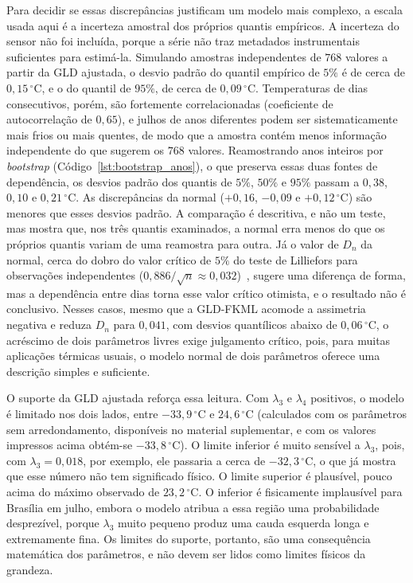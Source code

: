 Para decidir se essas discrepâncias justificam um modelo mais complexo, a escala usada aqui é a incerteza amostral dos próprios quantis empíricos. A incerteza do sensor não foi incluída, porque a série não traz metadados instrumentais suficientes para estimá-la. Simulando amostras independentes de $768$ valores a partir da GLD ajustada, o desvio padrão do quantil empírico de $5\%$ é de cerca de $0{,}15\,^\circ\text{C}$, e o do quantil de $95\%$, de cerca de $0{,}09\,^\circ\text{C}$. Temperaturas de dias consecutivos, porém, são fortemente correlacionadas (coeficiente de autocorrelação de $0{,}65$), e julhos de anos diferentes podem ser sistematicamente mais frios ou mais quentes, de modo que a amostra contém menos informação independente do que sugerem os $768$ valores. Reamostrando anos inteiros por \textit{bootstrap} (Código~\ref{lst:bootstrap_anos}), o que preserva essas duas fontes de dependência, os desvios padrão dos quantis de $5\%$, $50\%$ e $95\%$ passam a $0{,}38$, $0{,}10$ e $0{,}21\,^\circ\text{C}$. As discrepâncias da normal ($+0{,}16$, $-0{,}09$ e $+0{,}12\,^\circ\text{C}$) são menores que esses desvios padrão. A comparação é descritiva, e não um teste, mas mostra que, nos três quantis examinados, a normal erra menos do que os próprios quantis variam de uma reamostra para outra. Já o valor de $D_n$ da normal, cerca do dobro do valor crítico de $5\%$ do teste de Lilliefors para observações independentes ($0{,}886/\sqrt{n} \approx 0{,}032$)~\cite{lilliefors1967}, sugere uma diferença de forma, mas a dependência entre dias torna esse valor crítico otimista, e o resultado não é conclusivo. Nesses casos, mesmo que a GLD-FKML acomode a assimetria negativa e reduza $D_n$ para $0{,}041$, com desvios quantílicos abaixo de $0{,}06\,^\circ\text{C}$, o acréscimo de dois parâmetros livres exige julgamento crítico, pois, para muitas aplicações térmicas usuais, o modelo normal de dois parâmetros oferece uma descrição simples e suficiente.



O suporte da GLD ajustada reforça essa leitura. Com $\lambda_3$ e $\lambda_4$ positivos, o modelo é limitado nos dois lados, entre $-33,9\,^\circ\text{C}$ e $24,6\,^\circ\text{C}$ (calculados com os parâmetros sem arredondamento, disponíveis no material suplementar, e com os valores impressos acima obtém-se $-33,8\,^\circ\text{C}$). O limite inferior é muito sensível a $\lambda_3$, pois, com $\lambda_3 = 0,018$, por exemplo, ele passaria a cerca de $-32,3\,^\circ\text{C}$, o que já mostra que esse número não tem significado físico. O limite superior é plausível, pouco acima do máximo observado de $23,2\,^\circ\text{C}$. O inferior é fisicamente implausível para Brasília em julho, embora o modelo atribua a essa região uma probabilidade desprezível, porque $\lambda_3$ muito pequeno produz uma cauda esquerda longa e extremamente fina. Os limites do suporte, portanto, são uma consequência matemática dos parâmetros, e não devem ser lidos como limites físicos da grandeza.

